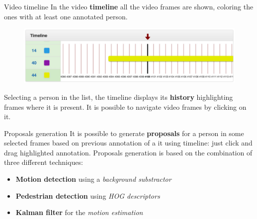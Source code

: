 \documentclass{beamer}
\begin{document}
\begin{tframe}{Video timeline}
In the video \textbf{timeline} all the video frames are shown, coloring the ones with at least one annotated person. 
\vspace{0.2cm}
\begin{figure}[h]
\centering
\includegraphics[scale=0.22]{images/timeline.jpg}
\end{figure}
\vspace{0.2cm}
Selecting a person in the list, the timeline displays its \textbf{history} highlighting frames where it is present. It is possible to navigate video frames by clicking on it.
\end{tframe}

\begin{tframe}{Proposals generation}
It is possible to generate \textbf{proposals} for a person in some selected frames based on previous  annotation of a it using timeline: just click and drag highlighted annotation.
\vspace{0.3cm}
Proposals generation is based on the combination of three different techniques:
\vspace{0.2cm}
\begin{itemize}
\item \textbf{Motion detection} using a \emph{background substractor}
\vspace{0.2cm}
\item \textbf{Pedestrian detection} using \emph{HOG descriptors}
\vspace{0.2cm}
\item \textbf{Kalman filter} for the \emph{motion estimation}
\end{itemize}
\end{tframe}
\end{document}
